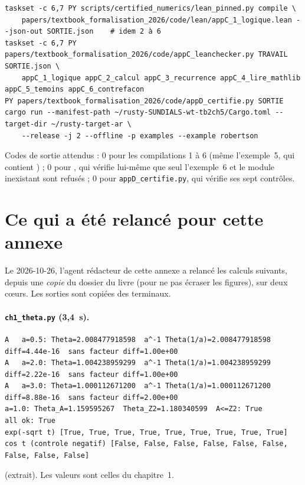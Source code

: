 \begin{lstlisting}[style=appC,language={}]
taskset -c 6,7 PY scripts/certified_numerics/lean_pinned.py compile \
    papers/textbook_formalisation_2026/code/lean/appC_1_logique.lean --json-out SORTIE.json    # idem 2 à 6
taskset -c 6,7 PY papers/textbook_formalisation_2026/code/appC_leanchecker.py TRAVAIL SORTIE.json \
    appC_1_logique appC_2_calcul appC_3_recurrence appC_4_lire_mathlib appC_5_temoins appC_6_contrefacon
PY papers/textbook_formalisation_2026/code/appD_certifie.py SORTIE
cargo run --manifest-path ~/rusty-SUNDIALS-wt-tb2ch5/Cargo.toml --target-dir ~/rusty-target-ar \
    --release -j 2 --offline -p examples --example robertson
\end{lstlisting}
Codes de sortie attendus : $0$ pour les compilations 1 à 6 (même l'exemple~5, qui contient ) ; $0$ pour
\chemin{appC_leanchecker.py}, qui vérifie lui-même que seul l'exemple~6 et le module inexistant sont refusés ; $0$ pour
\texttt{appD\_certifie.py}, qui vérifie ses sept contrôles.

\section{Ce qui a été relancé pour cette annexe}\label{appE:sec:relances}

Le 2026-10-26, l'agent rédacteur de cette annexe a relancé les calculs suivants, depuis une \emph{copie} du dossier du
livre (pour ne pas écraser les figures), sur deux cœurs. Les sorties sont copiées des terminaux.

\paragraph{\texttt{ch1\_theta.py} (3,4~s).}
\begin{lstlisting}[style=appC,language={}]
A   a=0.5: Theta=2.008477918598  a^-1 Theta(1/a)=2.008477918598  diff=4.44e-16  sans facteur diff=1.00e+00
A   a=2.0: Theta=1.004238959299  a^-1 Theta(1/a)=1.004238959299  diff=2.22e-16  sans facteur diff=1.00e+00
A   a=3.0: Theta=1.000112671200  a^-1 Theta(1/a)=1.000112671200  diff=8.88e-16  sans facteur diff=2.00e+00
a=1.0: Theta_A=1.159595267  Theta_Z2=1.180340599  A<=Z2: True
all ok: True
exp(-sqrt t) [True, True, True, True, True, True, True, True, True]
cos t (controle negatif) [False, False, False, False, False, False, False, False, False]
\end{lstlisting}
(extrait). Les valeurs sont celles du chapitre~1.

